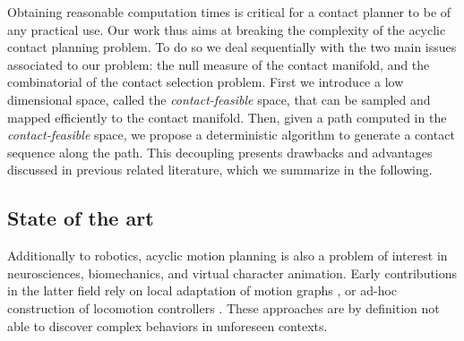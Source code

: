 Obtaining reasonable computation times is critical for a contact planner to be of any practical use. Our work thus aims at breaking the complexity of the acyclic contact planning problem.  To do so we deal sequentially with the two main issues associated to our problem: the null measure of the contact manifold, and the combinatorial of the contact selection problem. First we introduce a low dimensional space, called the \textit{contact-feasible} space, that can be sampled and mapped efficiently to the contact manifold. Then, given a path computed in the \textit{contact-feasible} space, we propose a deterministic algorithm to generate a contact sequence along the path.
This decoupling presents drawbacks and advantages discussed in previous related literature, which we summarize in the following.


\subsection{State of the art}

\newcommand{\Pa}{$\mathcal{P}_1$ }
\newcommand{\Pb}{$\mathcal{P}_2$ }

Additionally to robotics, acyclic motion planning is also a problem of interest in neurosciences, biomechanics, and virtual character animation.
Early contributions in the latter field rely on local adaptation of motion graphs \citep{citeulike:220163}, or ad-hoc construction of locomotion controllers \citep{Pettre:2003:LPD:846276.846313}. These approaches are by definition not able to discover complex behaviors in unforeseen contexts.

